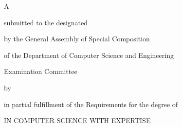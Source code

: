 \makeatletter

{\LARGE \@title}

{\Large
	\vfill \vfill A \csethesisTypeEn

	\vfill        submitted to the designated

	\vfill        by the General Assembly of Special Composition

	              of the Department of Computer Science and Engineering

	              Examination Committee

	\vfill        by

	\vfill        {\LARGE \@author}

	\vfill        in partial fulfillment of the Requirements for the degree of

	\vfill        \csediplwmaEn

	              IN COMPUTER SCIENCE
	\ifPhD\else
		          WITH EXPERTISE
			
		          \@Ekseidikseusi
	\fi

	\vfill \vfill \@date
}

\makeatother
\clearpage
